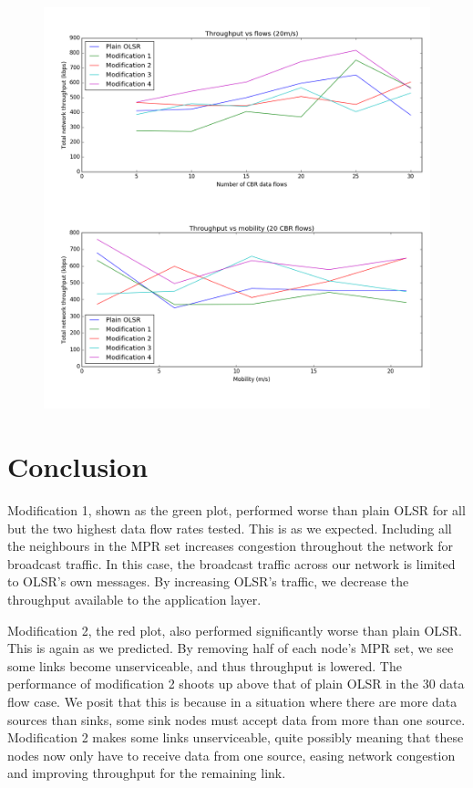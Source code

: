 \documentclass[12pt,a4paper]{article}
\begin{document}
\begin{figure}[ht]
\centering
\includegraphics[width=\textwidth]{figure_1}
\end{figure}

\section{Conclusion}
Modification 1, shown as the green plot, performed worse than plain OLSR for all but the two highest data flow rates tested. This is as we expected. Including all the neighbours in the MPR set increases congestion throughout the network for broadcast traffic. In this case, the broadcast traffic across our network is limited to OLSR's own messages. By increasing OLSR's traffic, we decrease the throughput available to the application layer.

Modification 2, the red plot, also performed significantly worse than plain OLSR. This is again as we predicted. By removing half of each node's MPR set, we see some links become unserviceable, and thus throughput is lowered. The performance of modification 2 shoots up above that of plain OLSR in the 30 data flow case. We posit that this is because in a situation where there are more data sources than sinks, some sink nodes must accept data from more than one source. Modification 2 makes some links unserviceable, quite possibly meaning that these nodes now only have to receive data from one source, easing network congestion and improving throughput for the remaining link.
\end{document}
